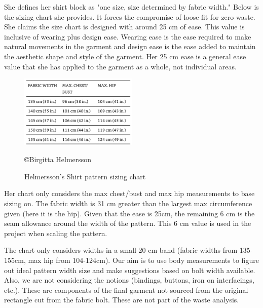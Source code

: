 She defines her shirt block as "one size, size determined by fabric width." Below is the sizing chart she provides. It forces the compromise of loose fit for zero waste. 
She claims the size chart is designed with around 25 cm of ease. This value is inclusive of wearing plus design ease. Wearing ease is the ease required to make natural movements in the garment and design ease is the ease added to maintain the aesthetic shape and style of the garment. Her 25 cm ease is a general ease value that she has applied to the garment as a whole, not individual areas. 
\begin{figure} [H] %
    \centering %
    \includegraphics[width = 0.5\textwidth]{Images/BH size chart.png} %
    \caption{Helmersson's Shirt pattern sizing chart}
    \copyright {Birgitta Helmersson} %
\end{figure}
Her chart only considers the max chest/bust and max hip measurements to base sizing on. The fabric width is 31 cm greater than the largest max circumference given (here it is the hip). Given that the ease is 25cm, the remaining 6 cm is the seam allowance around the width of the pattern. This 6 cm value is used in the project when scaling the pattern.

The chart only considers widths in a small 20 cm band (fabric widths from 135-155cm, max hip from 104-124cm). Our aim is to use body measurements to figure out ideal pattern width size and make suggestions based on bolt width available. Also, we are not considering the notions (bindings, buttons, iron on interfacings, etc.). These are components of the final garment not sourced from the original rectangle cut from the fabric bolt. These are not part of the waste analysis.

